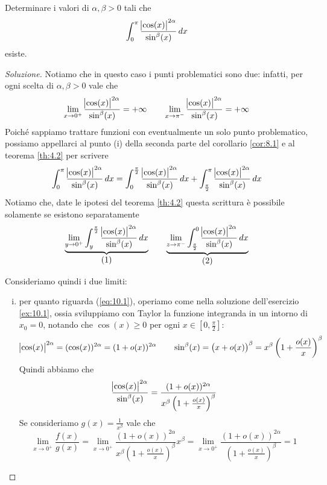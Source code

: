 \begin{exercise}
    \label{ex:10.2}
    Determinare i valori di $\alpha, \beta>0$ tali che
    \[
    \int_0^\pi \frac{\abs{\cos(x)}^{2\alpha}}{\sin^\beta(x)}\, dx
    \]
    esiste.
\end{exercise}
\begin{proof}[Soluzione]
    Notiamo che in questo caso i punti problematici sono due: infatti, per ogni scelta di $\alpha, \beta>0$ vale che
    \[
    \lim_{x\to 0^+}\frac{\abs{\cos(x)}^{2\alpha}}{\sin^\beta(x)} = +\infty \qquad \lim_{x\to \pi^-} \frac{\abs{\cos(x)}^{2\alpha}}{\sin^\beta(x)} = +\infty
    \]
    Poiché sappiamo trattare funzioni con eventualmente un solo punto problematico, possiamo appellarci al punto (i) della seconda parte del corollario \ref{cor:8.1} e al teorema \ref{th:4.2} per scrivere
    \[
    \int_0^\pi \frac{\abs{\cos(x)}^{2\alpha}}{\sin^\beta(x)}\, dx = \int_0^{\frac{\pi}{2}}\frac{\abs{\cos(x)}^{2\alpha}}{\sin^\beta(x)}\, dx + \int_{\frac{\pi}{2}}^\pi \frac{\abs{\cos(x)}^{2\alpha}}{\sin^\beta(x)}\, dx
    \]
    Notiamo che, date le ipotesi del teorema \ref{th:4.2} questa scrittura è possibile solamente se esistono separatamente
    \[
    \underbrace{\lim_{y\to 0^+} \int_y^{\frac{\pi}{2}} \frac{\abs{\cos(x)}^{2\alpha}}{\sin^\beta(x)}\, dx}_{\stepcounter{equation}\mbox{(\theequation)}} \qquad \underbrace{\lim_{z\to \pi^-}\int_{\frac{\pi}{2}}^0 \frac{\abs{\cos(x)}^{2\alpha}}{\sin^\beta(x)}\, dx}_{\stepcounter{equation}\mbox{(\theequation)}}
    \]
    \addtocounter{equation}{-2}\label{eq:10.1}
    \addtocounter{equation}{0}\label{eq:10.2}
    Consideriamo quindi i due limiti:
    \begin{enumerate}[(i)]
        \item per quanto riguarda (\ref{eq:10.1}), operiamo come nella soluzione dell'esercizio \ref{ex:10.1}, ossia sviluppiamo con Taylor la funzione integranda in un intorno di $x_0=0$, notando che $\cos(x)\ge 0$ per ogni $x\in\left[0,\frac{\pi}{2}\right]$:
        \[
        \abs{\cos(x)}^{2\alpha} = (\cos(x))^{2\alpha} = (1+o(x))^{2\alpha} \qquad \sin^\beta(x) = \left(x + o(x)\right)^\beta = x^\beta\left(1+\frac{o(x)}{x}\right)^\beta
        \]
        Quindi abbiamo che
        \[
        \frac{\abs{\cos(x)}^{2\alpha}}{\sin^\beta(x)} = \frac{(1+o(x))^{2\alpha}}{x^\beta\left(1+\frac{o(x)}{x}\right)^\beta}
        \]
        Se consideriamo $g(x) = \frac{1}{x^\beta}$ vale che
        \[
        \lim_{x\to 0^+}\frac{f(x)}{g(x)} = \lim_{x\to 0^+} \frac{(1+o(x))^{2\alpha}}{x^\beta\left(1+\frac{o(x)}{x}\right)^\beta} x^\beta = \lim_{x\to 0^+} \frac{(1+o(x))^{2\alpha}}{\left(1+\frac{o(x)}{x}\right)^\beta} = 1
\]
\end{enumerate}
\end{proof}
